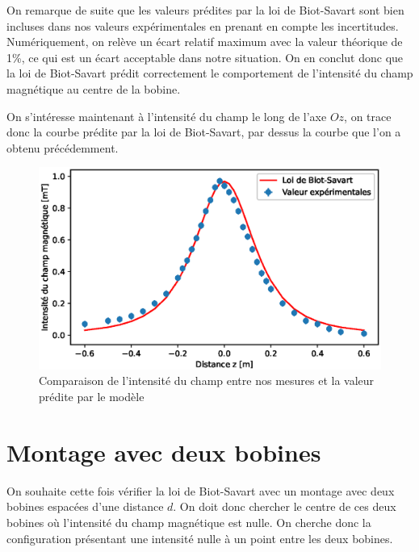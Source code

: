 \documentclass[12pt]{article}
\begin{document}
On remarque de suite que les valeurs prédites par la loi de Biot-Savart sont bien incluses dans nos valeurs expérimentales en prenant en compte les incertitudes. Numériquement, 
on relève un écart relatif maximum avec la valeur théorique de 1\%, ce qui est un écart acceptable dans notre situation. On en conclut donc que la loi de Biot-Savart 
prédit correctement le comportement de l'intensité du champ magnétique au centre de la bobine.


\newpage
On s'intéresse maintenant à l'intensité du champ le long de l'axe $Oz$, on trace donc la courbe prédite par la loi de Biot-Savart, par dessus la courbe que l'on a obtenu précédemment.
\begin{figure}[h!]
    \begin{center}
        \includegraphics[scale=0.6]{img/ComparaisonB.eps}
    \end{center}
    \caption{Comparaison de l'intensité du champ entre nos mesures et la valeur prédite par le modèle}
\end{figure}
\newpage

\section{Montage avec deux bobines}
On souhaite cette fois vérifier la loi de Biot-Savart avec un montage avec deux bobines espacées d'une distance $d$. On doit donc chercher le centre de ces deux bobines où 
l'intensité du champ magnétique est nulle. On cherche donc la configuration présentant une intensité nulle à un point entre les deux bobines.
\end{document}
